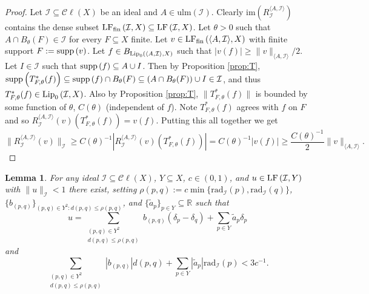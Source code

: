 \documentclass[12pt]{amsart}
\newtheorem{lemma}[theorem]{Lemma}
\theoremstyle{definition}
\numberwithin{equation}{section}
\def \R {\mathbb{R}}
\def \I {\mathcal{I}}
\def \sbs {\subseteq}
\def \im {\mathrm{im}}
\newcommand{\Cl}[1]{\mathcal{C}\ell\left(#1\right)}
\newcommand{\rad}[2]{\mathrm{rad}_{#1}\left(#2\right)}
\newcommand{\ulm}[1]{\mathrm{ulm}\left(#1\right)}
\begin{document}
\begin{proof}
Let $\I \sbs \Cl{X}$ be an ideal and $A \in \ulm{\I}$. Clearly $\im(R^{\langle A,\I \rangle}_\I)$ contains the dense subset $\LFf{\I}{X} \sbs \LF{\I}{X}$. Let $\theta > 0$ such that $A \cap B_\theta(F) \in \I$ for every $F \sbs X$ finite. Let $v \in \LFf{\langle A,\I \rangle}{X}$ with finite support $F := \supp{v}$. Let $f \in B_{\Lip{\langle A,\I \rangle}{X}}$ such that $|v(f)| \geq \|v\|_{\langle A,\I \rangle}/2$. Let $I \in \I$ such that $\supp{f} \sbs A \cup I$. Then by Proposition \ref{prop:T}, $\supp{T^*_{F,\theta}(f)} \sbs \supp{f} \cap B_\theta(F) \sbs (A \cap B_\theta(F)) \cup I \in \I$, and thus $T^*_{F,\theta}(f) \in \Lip{\I}{X}$. Also by Proposition \ref{prop:T}, $\|T^*_{F,\theta}(f)\|$ is bounded by some function of $\theta$, $C(\theta)$ (independent of $f$). Note $T^*_{F,\theta}(f)$ agrees with $f$ on $F$ and so $R^{\langle A,\I \rangle}_\I(v)(T^*_{F,\theta}(f)) = v(f)$. Putting this all together we get
$$\|R^{\langle A,\I \rangle}_\I(v)\|_\I \geq C(\theta)^{-1}|R^{\langle A,\I \rangle}_\I(v)(T^*_{F,\theta}(f))| = C(\theta)^{-1}|v(f)| \geq \frac{C(\theta)^{-1}}{2}\|v\|_{\langle A,\I \rangle}.$$
\end{proof}

\begin{lemma} \label{lem:quotientclose}
For any ideal $\I \sbs \Cl{X}$, $Y \sbs X$, $c \in (0,1)$, and $u \in \LF{\I}{Y}$ with $\|u\|_\I < 1$ there exist, setting $\rho(p,q) := c \min\{\rad{\I}{p},\rad{\I}{q}\}$, $\{b_{(p,q)}\}_{(p,q) \in Y^2: d(p,q) \leq \rho(p,q)}$, and $\{\tilde{a}_p\}_{p \in Y} \sbs \R$ such that
$$u = \sum_{\substack{(p,q) \in Y^2 \\ d(p,q) \leq \rho(p,q)}}b_{(p,q)}(\delta_p-\delta_q) + \sum_{p \in Y} \tilde{a}_{p} \delta_p$$
and
$$\sum_{\substack{(p,q) \in Y^2 \\ d(p,q) \leq \rho(p,q)}}|b_{(p,q)}|d(p,q) + \sum_{p \in Y} |\tilde{a}_{p}|\rad{\I}{p} < 3c^{-1}.$$
\end{lemma}
\end{document}
